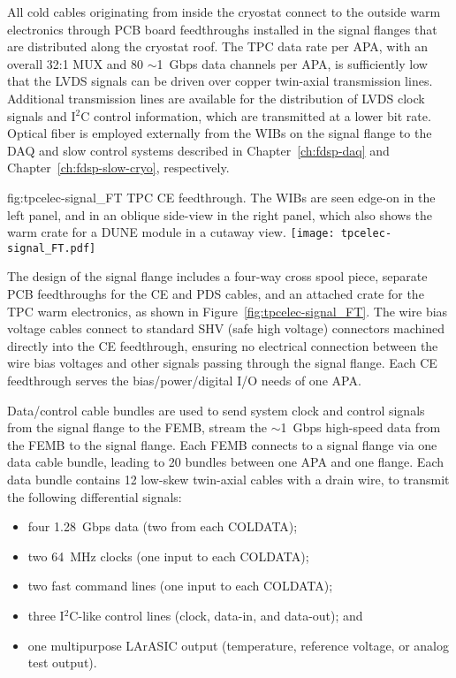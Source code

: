 All cold cables originating from inside the cryostat connect to the outside warm electronics through PCB board feedthroughs
installed in the signal flanges that are distributed along the cryostat roof.
The TPC data rate per APA, with an overall 32:1 MUX and 80 $\sim$1~Gbps data channels per APA,
is sufficiently low that the LVDS signals can be driven over copper twin-axial transmission lines.
Additional transmission lines are available for the distribution of LVDS clock signals and I$^2$C control information,
which are transmitted at a lower bit rate.
Optical fiber is employed externally from the WIBs on the signal flange to the DAQ and slow control systems described in Chapter~\ref{ch:fdsp-daq} and Chapter~\ref{ch:fdsp-slow-cryo}, respectively.

\begin{dunefigure}
{fig:tpcelec-signal_FT}
{TPC CE feedthrough. The WIBs are seen edge-on in the left panel, and in an oblique side-view in the right panel, which also shows the warm crate for a DUNE module in a cutaway view.}
\texttt{[image: tpcelec-signal\_FT.pdf]}
\end{dunefigure}

The design of the signal flange includes a four-way cross spool piece, separate PCB feedthroughs for the CE and PDS cables, and
an attached crate for the TPC warm electronics, as shown in Figure~\ref{fig:tpcelec-signal_FT}.
The wire bias voltage cables connect to standard SHV (safe high voltage) connectors machined directly into the CE feedthrough,
ensuring no electrical connection between the wire bias voltages and other signals passing through the signal flange.
Each CE feedthrough serves the bias/power/digital I/O needs of one APA.  

Data/control cable bundles are used to send system clock and control signals from the 
signal flange to the FEMB, stream the $\sim$1~Gbps high-speed data from the FEMB to the signal flange.  Each FEMB 
connects to a signal flange via one data cable bundle, leading to 20 bundles between one APA and one flange.  Each data bundle contains 12 low-skew twin-axial cables with a drain wire, 
to transmit the following differential signals:

\begin{itemize}
    \item four 1.28~Gbps data (two from each COLDATA);
    \item two 64~MHz clocks (one input to each COLDATA);
    \item two fast command lines (one input to each COLDATA);
    \item three I$^2$C-like control lines (clock, data-in, and data-out); and
    \item one multipurpose LArASIC output (temperature, reference voltage, or analog test output).
\end{itemize}

